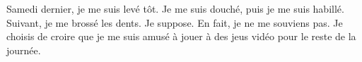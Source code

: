 \documentclass[letterpaper]{article}
\begin{document}
\doublespacing
Samedi dernier, je me suis  levé tôt. Je me suis douché, puis je me suis habillé. Suivant, je me brossé les dents. Je suppose. En fait, je ne me souviens pas. Je choisis de croire que je me suis amusé à jouer à des jeus vidéo pour le reste de la journée. 
\end{document}
